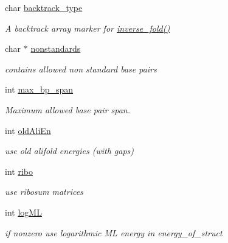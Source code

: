 \begin{DoxyCompactItemize}
char \hyperlink{group__model__details_ga83bdb43472a259c71e69fa9f70f420c3}{backtrack\+\_\+type}
\begin{DoxyCompactList}\small\item\em A backtrack array marker for \hyperlink{group__inverse__fold_ga7af026de55d4babad879f2c92559cbbc}{inverse\+\_\+fold()} \end{DoxyCompactList}\item 
char $\ast$ \hyperlink{group__model__details_ga2695d91cc535d09c2eae5c3884e2ec64}{nonstandards}
\begin{DoxyCompactList}\small\item\em contains allowed non standard base pairs \end{DoxyCompactList}\item 
int \hyperlink{group__model__details_ga18df869af0d70101106458fc3f027806}{max\+\_\+bp\+\_\+span}
\begin{DoxyCompactList}\small\item\em Maximum allowed base pair span. \end{DoxyCompactList}\item 
\mbox{\label{group__model__details_gac408868ba00671cbc7d1d535105af045}} 
int \hyperlink{group__model__details_gac408868ba00671cbc7d1d535105af045}{old\+Ali\+En}
\begin{DoxyCompactList}\small\item\em use old alifold energies (with gaps) \end{DoxyCompactList}\item 
\mbox{\label{group__model__details_ga0656afca1d2853f9ee6591172f5638de}} 
int \hyperlink{group__model__details_ga0656afca1d2853f9ee6591172f5638de}{ribo}
\begin{DoxyCompactList}\small\item\em use ribosum matrices \end{DoxyCompactList}\item 
\mbox{\label{group__model__details_ga80c3c5fd35e7479704cc91d2d0367743}} 
int \hyperlink{group__model__details_ga80c3c5fd35e7479704cc91d2d0367743}{log\+ML}
\begin{DoxyCompactList}\small\item\em if nonzero use logarithmic ML energy in energy\+\_\+of\+\_\+struct \end{DoxyCompactList}\end{DoxyCompactItemize}


